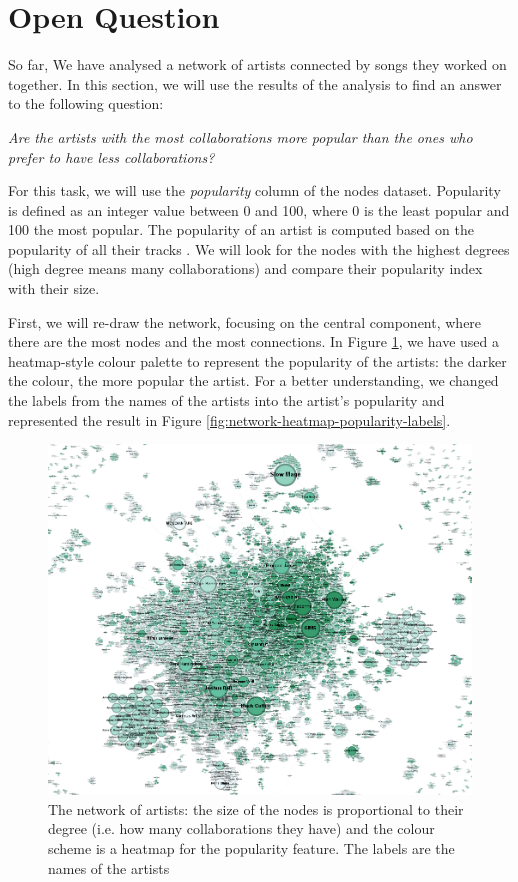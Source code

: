 \documentclass[sigchi]{acmart}
\begin{document}
\section{Open Question}

So far, We have analysed a network of artists connected by songs they worked on together. In this section, we will use the results of the analysis to find an answer to the following question:

\textit{Are the artists with the most collaborations more popular than the ones who prefer to have less collaborations?}

For this task, we will use the \textit{popularity} column of the nodes dataset. Popularity is defined as an integer value between 0 and 100, where 0 is the least popular and 100 the most popular. The popularity of an artist is computed based on the popularity of all their tracks \cite{GetArtist}. We will look for the nodes with the highest degrees (high degree means many collaborations) and compare their popularity index with their size.

First, we will re-draw the network, focusing on the central component, where there are the most nodes and the most connections. In Figure \ref{fig:network-heatmap-artists-labels}, we have used a heatmap-style colour palette to represent the popularity of the artists: the darker the colour, the more popular the artist. For a better understanding, we changed the labels from the names of the artists into the artist's popularity and represented the result in Figure \ref{fig:network-heatmap-popularity-labels}.

\begin{figure}[h!]
    \includegraphics[width=\linewidth]{img/Network_Heatmap_for_Popularity_WIth_Labels.png}	
    \caption{The network of artists: the size of the nodes is proportional to their degree (i.e. how many collaborations they have) and the colour scheme is a heatmap for the popularity feature. The labels are the names of the artists}
    \label{fig:network-heatmap-artists-labels}
\end{figure}
\end{document}
